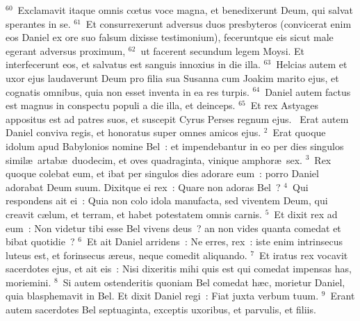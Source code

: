 ${}^{60}$~Exclamavit itaque omnis cœtus voce magna, et benedixerunt Deum, qui salvat sperantes in se.
${}^{61}$~Et consurrexerunt adversus duos presbyteros (convicerat enim eos Daniel ex ore suo falsum dixisse testimonium), feceruntque eis sicut male egerant adversus proximum,
${}^{62}$~ut facerent secundum legem Moysi. Et interfecerunt eos, et salvatus est sanguis innoxius in die illa.
${}^{63}$~Helcias autem et uxor ejus laudaverunt Deum pro filia sua Susanna cum Joakim marito ejus, et cognatis omnibus, quia non esset inventa in ea res turpis.
${}^{64}$~Daniel autem factus est magnus in conspectu populi a die illa, et deinceps.
${}^{65}$~Et rex Astyages appositus est ad patres suos, et suscepit Cyrus Perses regnum ejus.
~\lettrine[lines=10,image=true,loversize=0.05,lraise=-0.03]{E}{}rat autem Daniel conviva regis, et honoratus super omnes amicos ejus.
${}^{2}$~Erat quoque idolum apud Babylonios nomine Bel~: et impendebantur in eo per dies singulos simil\ae\ artab\ae\ duodecim, et oves quadraginta, vinique amphor\ae\ sex.
${}^{3}$~Rex quoque colebat eum, et ibat per singulos dies adorare eum~: porro Daniel adorabat Deum suum. Dixitque ei rex~: Quare non adoras Bel~?
${}^{4}$~Qui respondens ait ei~: Quia non colo idola manufacta, sed viventem Deum, qui creavit c\ae lum, et terram, et habet potestatem omnis carnis.
${}^{5}$~Et dixit rex ad eum~: Non videtur tibi esse Bel vivens deus~? an non vides quanta comedat et bibat quotidie~?
${}^{6}$~Et ait Daniel arridens~: Ne erres, rex~: iste enim intrinsecus luteus est, et forinsecus \ae reus, neque comedit aliquando.
${}^{7}$~Et iratus rex vocavit sacerdotes ejus, et ait eis~: Nisi dixeritis mihi quis est qui comedat impensas has, moriemini.
${}^{8}$~Si autem ostenderitis quoniam Bel comedat h\ae c, morietur Daniel, quia blasphemavit in Bel. Et dixit Daniel regi~: Fiat juxta verbum tuum.
${}^{9}$~Erant autem sacerdotes Bel septuaginta, exceptis uxoribus, et parvulis, et filiis.

